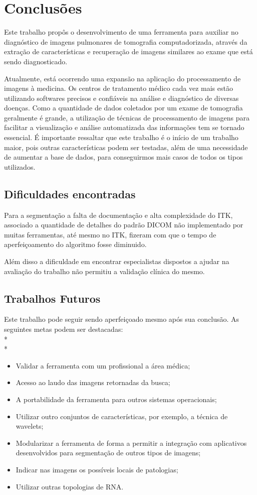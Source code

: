 \chapter{Conclusões}

Este trabalho propôs o desenvolvimento de uma ferramenta para auxiliar no diagnóstico de imagens pulmonares de tomografia computadorizada, através da extração de características e recuperação de imagens similares ao exame que está sendo diagnosticado.

Atualmente, está ocorrendo uma expansão na aplicação do processamento de imagens à medicina. Os centros de tratamento médico cada vez mais estão utilizando softwares precisos e confiáveis na análise e diagnóstico de diversas doenças. Como a quantidade de dados coletados por um exame de tomografia geralmente é grande, a utilização de técnicas de processamento de imagens para facilitar a visualização e análise automatizada das informações tem se tornado essencial. É importante ressaltar que este trabalho é o início de um trabalho maior, pois outras características podem ser testadas, além de uma necessidade de aumentar a base de dados, para conseguirmos mais casos de todos os tipos utilizados.

\section{Dificuldades encontradas}

Para a segmentação a falta de documentação e alta complexidade do ITK, associado a quantidade de detalhes do padrão DICOM não implementado por muitas ferramentas, até mesmo no ITK, fizeram com que o tempo de aperfeiçoamento do algoritmo fosse diminuido.

Além disso a dificuldade em encontrar especialistas dispostos a ajudar na avaliação do trabalho não permitiu a validação clínica do mesmo.

\section{Trabalhos Futuros}

Este trabalho pode seguir sendo aperfeiçoado mesmo após sua conclusão. As seguintes metas podem ser destacadas:
\\* \\*
\begin{itemize}
 \item Validar a ferramenta com um profissional a área médica;
 \item Acesso ao laudo das imagens retornadas da busca;
 \item A portabilidade da ferramenta para outros sistemas operacionais;
 \item Utilizar outro conjuntos de características, por exemplo, a técnica de wavelets;
 \item Modularizar a ferramenta de forma a permitir a integração com aplicativos desenvolvidos para segmentação de outros tipos de imagens;
 \item Indicar nas imagens os possíveis locais de patologias;
 \item Utilizar outras topologias de RNA.
\end{itemize}

